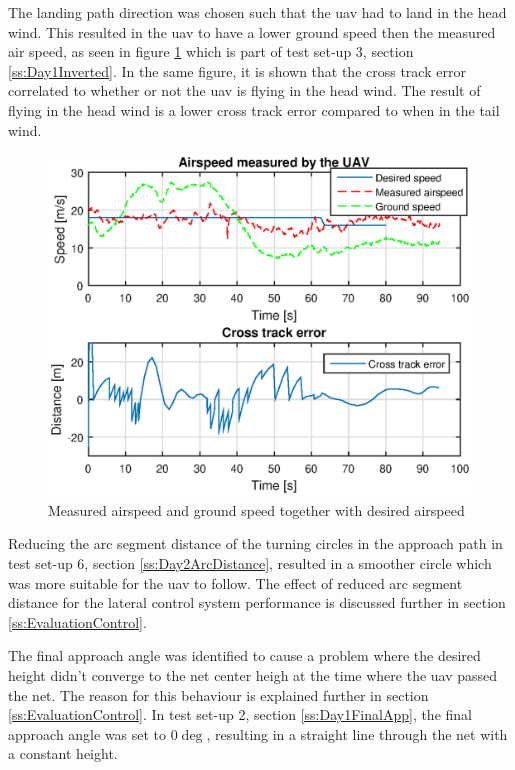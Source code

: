 The landing path direction was chosen such that the \gls{uav} had to land in the head wind. This resulted in the \gls{uav} to have a lower ground speed then the measured air speed, as seen in figure \ref{Fig:Airspeed31mai125420} which is part of test set-up 3, section \ref{ss:Day1Inverted}. In the same figure, it is shown that the cross track error correlated to whether or not the \gls{uav} is flying in the head wind. The result of flying in the head wind is a lower cross track error compared to when in the tail wind.
\begin{figure}[H]
\centering
\includegraphics[scale=0.9]{figs/Experiment/airspeed31mai125420.eps}
\caption{Measured airspeed and ground speed together with desired airspeed}
\label{Fig:Airspeed31mai125420}
\end{figure}

Reducing the arc segment distance of the turning circles in the approach path in test set-up 6, section \ref{ss:Day2ArcDistance}, resulted in a smoother circle which  was more suitable for the \gls{uav} to follow. The effect of reduced arc segment distance for the lateral control system performance is discussed further in section \ref{ss:EvaluationControl}.

The final approach angle was identified to cause a problem where the desired height didn't converge to the net center heigh at the time where the \gls{uav} passed the net. The reason for this behaviour is explained further in section \ref{ss:EvaluationControl}. In test set-up 2, section \ref{ss:Day1FinalApp}, the final approach angle was set to $0 \deg$, resulting in a straight line through the net with a constant height.

